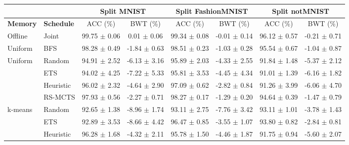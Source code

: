 \begin{tabular}{llcccccc}
	\toprule
	&                 & \multicolumn{2}{c}{\textbf{Split MNIST}} & \multicolumn{2}{c}{\textbf{Split FashionMNIST}} & \multicolumn{2}{c}{\textbf{Split notMNIST}} \\ \midrule
	\textbf{Memory}                 & \textbf{Schedule} & ACC (\%)            & BWT (\%)           & ACC (\%)               & BWT (\%)               & ACC (\%)             & BWT (\%)             \\ \midrule
	Offline                            & Joint           & 99.75 $\pm$ 0.06      & 0.01 $\pm$ 0.06      & 99.34 $\pm$ 0.08         & -0.01 $\pm$ 0.14         & 96.12 $\pm$ 0.57       & -0.21 $\pm$ 0.71       \\ 
	Uniform & BFS & 98.28 $\pm$ 0.49 & -1.84 $\pm$ 0.63 & 98.51 $\pm$ 0.23 & -1.03 $\pm$ 0.28 & 95.54 $\pm$ 0.67 & -1.04 $\pm$ 0.87 \\ \midrule
	\multirow{4}{*}{Uniform}                                   & Random          & 94.91 $\pm$ 2.52      & -6.13 $\pm$ 3.16     & 95.89 $\pm$ 2.03         & -4.33 $\pm$ 2.55         & 91.84 $\pm$ 1.48       & -5.37 $\pm$ 2.12       \\
	& ETS             & 94.02 $\pm$ 4.25      & -7.22 $\pm$ 5.33     & 95.81 $\pm$ 3.53         & -4.45 $\pm$ 4.34         & 91.01 $\pm$ 1.39       & -6.16 $\pm$ 1.82       \\
	& Heuristic         & 96.02 $\pm$ 2.32      & -4.64 $\pm$ 2.90     & 97.09 $\pm$ 0.62         & -2.82 $\pm$ 0.84         & 91.26 $\pm$ 3.99       & -6.06 $\pm$ 4.70       \\
	& RS-MCTS            & 97.93 $\pm$ 0.56      & -2.27 $\pm$ 0.71     & 98.27 $\pm$ 0.17         & -1.29 $\pm$ 0.20         & 94.64 $\pm$ 0.39       & -1.47 $\pm$ 0.79       \\ \midrule
	\multirow{4}{*}{k-means}  & Random          & 92.65 $\pm$ 1.38      & -8.96 $\pm$ 1.74     & 93.11 $\pm$ 2.75         & -7.76 $\pm$ 3.42         & 93.11 $\pm$ 1.01       & -3.78 $\pm$ 1.43       \\
	& ETS             & 92.89 $\pm$ 3.53      & -8.66 $\pm$ 4.42     & 96.47 $\pm$ 0.85         & -3.55 $\pm$ 1.07         & 93.80 $\pm$ 0.82       & -2.84 $\pm$ 0.81       \\
	& Heuristic         & 96.28 $\pm$ 1.68      & -4.32 $\pm$ 2.11     & 95.78 $\pm$ 1.50         & -4.46 $\pm$ 1.87         & 91.75 $\pm$ 0.94       & -5.60 $\pm$ 2.07       \\

\end{tabular}
